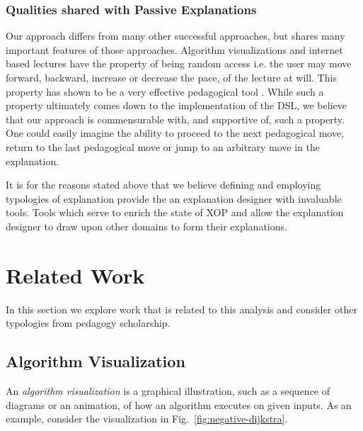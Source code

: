 \documentclass[conference]{IEEEtran}
\begin{document}
\subsubsection{Qualities shared with Passive Explanations}
Our approach differs from many other successful
approaches\cite{brecht2012learning, brecht2008enabling}, but shares many
important features of those approaches. Algorithm visualizations and internet
based lectures have the property of being random access i.e. the user may move
forward, backward, increase or decrease the pace, of the lecture at will. This
property has shown to be a very effective pedagogical tool\cite{cardall2008live,
  zhang2005interactive, zhang2006instructional, Schwan2004293, Merkt2011687} .
While such a property ultimately comes down to the implementation of the DSL, we
believe that our approach is commensurable with, and supportive of, such a
property. One could easily imagine the ability to proceed to the next
pedagogical move, return to the last pedagogical move or jump to an arbitrary
move in the explanation.

It is for the reasons stated above that we believe defining and employing
typologies of explanation provide the an explanation designer with invaluable
tools. Tools which serve to enrich the state of XOP and allow the explanation
designer to draw upon other domains to form their explanations.

\section{Related Work}
\label{sec:rw}

In this section we explore work that is related to this analysis and consider other
typologies from pedagogy scholarship.

\subsection{Algorithm Visualization}
\label{sec:rw:vis}


An \emph{algorithm visualization} is a graphical illustration, such as a
sequence of diagrams or an animation, of how an algorithm executes on given
inputs. As an example, consider the visualization in
Fig.~\ref{fig:negative-dijkstra}.


\end{document}
